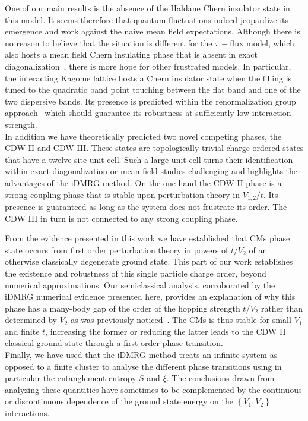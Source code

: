 \documentclass[aps,prx,10pt,twocolumn,floatfix,superscriptaddress,showpacs,numerical,footinbib]{revtex4-1}
\begin{document}
One of our main results is the absence of the Haldane Chern insulator state in this model.
%
It seems therefore that quantum fluctuations indeed jeopardize its emergence and work against
the naive mean field expectations.
%
Although there is no reason to believe that the situation is different for the $\pi-$flux model, which also hosts a
mean field Chern insulating phase that is absent in exact diagonalization~\cite{WF10,JGC13}, 
there is more hope for other frustrated models.
%
In particular, the interacting Kagome lattice hosts a Chern insulator state when the filling is tuned to
the quadratic band point touching between the flat band and one of the two dispersive bands.
%
Its presence is predicted within the renormalization group approach~\cite{SF08,SYF09} which should guarantee
its robustness at sufficiently low interaction strength.\\
%
In addition we have theoretically predicted two novel competing phases, the CDW II and CDW III.
%
These states are topologically trivial charge ordered states that have a twelve site unit cell.
%
Such a large unit cell turns their identification within exact diagonalization or mean field studies 
challenging and highlights the advantages of the iDMRG method.
%
On the one hand the CDW II phase is a strong coupling phase that is stable upon perturbation theory in $V_{1,2}/t$.
%
Its presence is guaranteed as long as the system does not frustrate its order. 
%
The CDW III in turn is not connected to any strong coupling phase.

From the evidence presented in this work we have established that CMs phase state occurs from first
order perturbation theory in powers of $t/V_{2}$ of an otherwise classically degenerate ground state.
%
This part of our work establishes the existence and robustness 
of this single particle charge order, beyond numerical approximations.
%
Our semiclassical analysis, corroborated by the iDMRG numerical evidence presented here,
provides an explanation of why this phase has a many-body gap of the order of the hopping strength $t/V_{2}$ 
rather than determined by $V_{2}$ as was previously noticed~\cite{GCC13,DH14,DCH14}.
%
The CMs is thus stable for small $V_{1}$ and finite $t$, increasing the former or reducing the latter leads to the CDW II classical ground state
through a first order phase transition.\\
%
Finally, we have used that the iDMRG method treats an infinite system as opposed to a finite cluster to analyse 
the different phase transitions using in particular the entanglement entropy $S$ and $\xi$.
%
The conclusions drawn from analyzing these quantities have sometimes to be complemented by the continuous 
or discontinuous dependence of the ground state energy on the $\left\lbrace V_{1},V_{2}\right\rbrace$ interactions.
%
\end{document}
